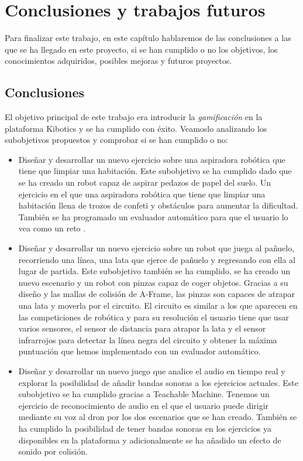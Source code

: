 \chapter{Conclusiones y trabajos futuros}\label{conclusion}
Para finalizar este trabajo, en este capítulo hablaremos de las conclusiones a las que se ha llegado en este proyecto, si se han cumplido o no los objetivos,  los conocimientos adquiridos, posibles mejoras y futuros proyectos.

\section{Conclusiones}

El objetivo principal de este trabajo era introducir la \textit{gamificación} en la plataforma Kibotics y se ha cumplido con éxito. Veamoslo analizando los subobjetivos propuestos y comprobar si se han cumplido o no:

\begin{itemize}
    \item Diseñar y desarrollar un nuevo ejercicio sobre una aspiradora robótica que tiene que limpiar una habitación.  Este subobjetivo se ha cumplido dado que se ha creado un robot capaz de aspirar pedazos de papel del suelo. Un ejercicio en el que una aspiradora robótica que tiene que limpiar una habitación llena de trozos de confeti y obstáculos para aumentar la dificultad. También se ha programado un evaluador automático para que el usuario lo vea como un reto .

    \item Diseñar y desarrollar un nuevo ejercicio sobre un robot que juega al pañuelo, recorriendo una línea, una lata que ejerce de pañuelo y regresando con ella al lugar de partida. Este subobjetivo también se ha cumplido, se ha creado un nuevo escenario y un robot con pinzas capaz de coger objetos. Gracias a su diseño y las mallas de colisión de A-Frame, las pinzas son capaces de atrapar una lata y moverla por el circuito. El circuito es similar a los que aparecen en las competiciones de robótica y para su resolución el usuario tiene que usar varios sensores, el sensor de distancia para atrapar la lata y el sensor infrarrojos para detectar la línea negra del circuito y obtener la máxima puntuación que hemos implementado con un evaluador automático. 
    
        \item Diseñar y desarrollar un nuevo juego que analice el audio en tiempo real y explorar la posibilidad de añadir bandas sonoras a los ejercicios actuales.  Este subobjetivo se ha cumplido gracias a Teachable Machine. Tenemos un ejercicio de reconocimiento de audio en el que el usuario puede dirigir mediante su voz al dron por los dos escenarios que se han creado. También se ha cumplido la posibilidad de tener bandas sonoras en los ejercicios ya disponibles en la plataforma y adicionalmente se ha añadido un efecto de sonido por colisión. 

\end{itemize}

